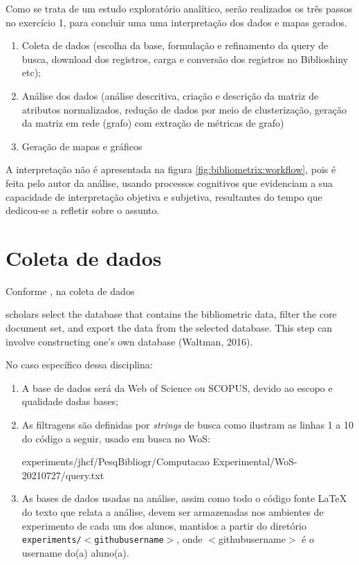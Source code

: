 Como se trata de um estudo exploratório analítico, serão realizados os três passos no exercício 1, para concluir uma uma interpretação dos dados e mapas gerados.
\begin{enumerate}
    \item Coleta de dados (escolha da base, formulação e refinamento da query de busca, download dos registros, carga e conversão dos registros no Biblioshiny etc);
    \item Análise dos dados (análise descritiva, criação e descrição da matriz de atributos normalizados, redução de dados por meio de clusterização, geração da matriz em rede (grafo) com extração de métricas de grafo)
    \item Geração de mapas e gráficos
\end{enumerate}

A interpretação não é apresentada na figura \ref{fig:bibliometrix:workflow}, pois é feita pelo autor da análise, usando processos cognitivos que evidenciam a sua capacidade de interpretação objetiva e subjetiva, resultantes do tempo que dedicou-se a refletir sobre o assunto.

\section{Coleta de dados}

Conforme \cite{aria_bibliometrix_2017},
na coleta de dados 

\begin{itquote}
    scholars select the database that contains the bibliometric data, filter the core document set, and export
the data from the selected database. This step can involve constructing one’s own database (Waltman, 2016).
\end{itquote}

No caso específico dessa disciplina:
\begin{enumerate}
    \item A base de dados será da Web of Science ou SCOPUS, devido ao escopo e qualidade dadas bases;
    \item As filtragens são definidas por \textit{strings} de busca como ilustram as linhas 1 a 10 do código a seguir, usado em busca no WoS:

{experiments/jhcf/PesqBibliogr/Computacao Experimental/WoS-20210727/query.txt}

\item As bases de dados usadas na análise, assim como todo o código fonte \LaTeX~ do texto que relata a análise, devem ser armazenadas nos ambientes de experimento de cada um dos alunos, mantidos a partir do diretório \texttt{experiments/$<$githubusername$>$}, onde $<$githubusername$>$ é o username do(a) aluno(a).

\end{enumerate}

